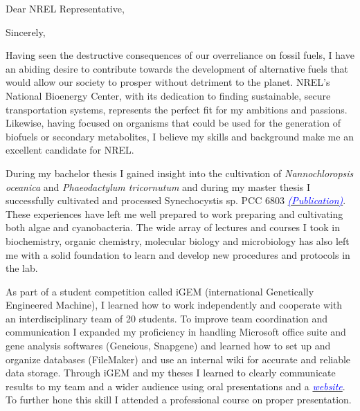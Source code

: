 \documentclass[11pt,a4paper,sans]{moderncv}
\begin{document}
\thispagestyle{titlepage}

\date{\today}
\opening{Dear NREL Representative,}
\closing{Sincerely,}
\makelettertitle
\begin{spacing}{1.15}

Having seen the destructive consequences of our overreliance on fossil fuels, I have an abiding desire to contribute towards the development of alternative fuels that would allow our society to prosper without detriment to the planet. NREL's National Bioenergy Center, with its dedication to finding sustainable, secure transportation systems, represents the perfect fit for my ambitions and passions. Likewise, having focused on organisms that could be used for the generation of biofuels or secondary metabolites, I believe my skills and background make me an excellent candidate for NREL.\par\vspace*{1mm}

During my bachelor thesis I gained insight into the cultivation of \textit{Nannochloropsis oceanica} and \textit{Phaeodactylum tricornutum} and during my master thesis I successfully cultivated and processed Synechocystis sp. PCC 6803 {\href{https://www.ncbi.nlm.nih.gov/pubmed/29517395}{\textcolor{blue}{{\textit{(Publication)}}}}}. These experiences have left me well prepared to work preparing and cultivating both algae and cyanobacteria. The wide array of lectures and courses I took in biochemistry, organic chemistry, molecular biology and microbiology has also left me with a solid foundation to learn and develop new procedures and protocols in the lab.\par\vspace*{1mm}

As part of a student competition called iGEM (international Genetically Engineered Machine), I learned how to work independently and cooperate with an interdisciplinary team of 20 students. To improve team coordination and communication I expanded my proficiency in handling Microsoft office suite and gene analysis softwares (Geneious, Snapgene) and learned how to set up and organize databases (FileMaker) and use an internal wiki for accurate and reliable data storage. Through iGEM and my theses I learned to clearly communicate results to my team and a wider audience using oral presentations and a {\href{http://2015.igem.org/Team:Freiburg}{\textcolor{blue}{\textit{website}}}}. To further hone this skill I attended a professional course on proper presentation.\par\vspace*{1mm}


\end{spacing}
\end{document}
